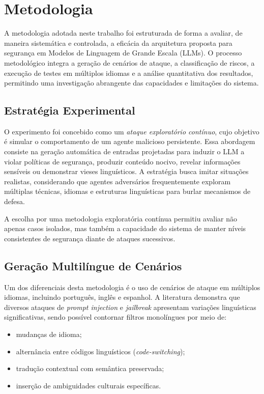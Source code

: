 \section{Metodologia}
\label{sec:background}

A metodologia adotada neste trabalho foi estruturada de forma a avaliar, de maneira sistemática e controlada, a eficácia da arquitetura proposta para segurança em Modelos de Linguagem de Grande Escala (LLMs). O processo metodológico integra a geração de cenários de ataque, a classificação de riscos, a execução de testes em múltiplos idiomas e a análise quantitativa dos resultados, permitindo uma investigação abrangente das capacidades e limitações do sistema.

\subsection{Estratégia Experimental}

O experimento foi concebido como um \textit{ataque exploratório contínuo}, cujo objetivo é simular o comportamento de um agente malicioso persistente. Essa abordagem consiste na geração automática de entradas projetadas para induzir o LLM a violar políticas de segurança, produzir conteúdo nocivo, revelar informações sensíveis ou demonstrar vieses linguísticos. A estratégia busca imitar situações realistas, considerando que agentes adversários frequentemente exploram múltiplas técnicas, idiomas e estruturas linguísticas para burlar mecanismos de defesa.

A escolha por uma metodologia exploratória contínua permitiu avaliar não apenas casos isolados, mas também a capacidade do sistema de manter níveis consistentes de segurança diante de ataques sucessivos.

\subsection{Geração Multilíngue de Cenários}

Um dos diferenciais desta metodologia é o uso de cenários de ataque em múltiplos idiomas, incluindo português, inglês e espanhol. A literatura demonstra que diversos ataques de \textit{prompt injection} e \textit{jailbreak} apresentam variações linguísticas significativas, sendo possível contornar filtros monolíngues por meio de:

\begin{itemize}
    \item mudanças de idioma;
    \item alternância entre códigos linguísticos (\textit{code-switching});
    \item tradução contextual com semântica preservada;
    \item inserção de ambiguidades culturais específicas.
\end{itemize}

